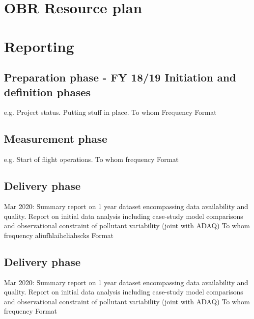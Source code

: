 \documentclass[11pt]{article} %
\begin{document}
\section{OBR Resource plan}

\newpage
\section{Reporting}

\subsection{Preparation phase - FY 18/19 Initiation and definition phases}
e.g. Project status. Putting stuff in place.
To whom
Frequency 
Format

\subsection{Measurement phase} 
e.g.  Start of flight operations.
To whom
frequency 
Format

\subsection{Delivery phase} 
Mar 2020: Summary report on 1 year dataset encompassing data availability and quality. Report on initial data analysis including case-study model comparisons and observational constraint of pollutant variability (joint with ADAQ) 
To whom
frequency 
aliufhlaihcliahscks Format

\subsection{Delivery phase} 
Mar 2020: Summary report on 1 year dataset encompassing data availability and quality. Report on initial data analysis including case-study model comparisons and observational constraint of pollutant variability (joint with ADAQ) 
To whom
frequency 
Format
\newpage
\end{document}
